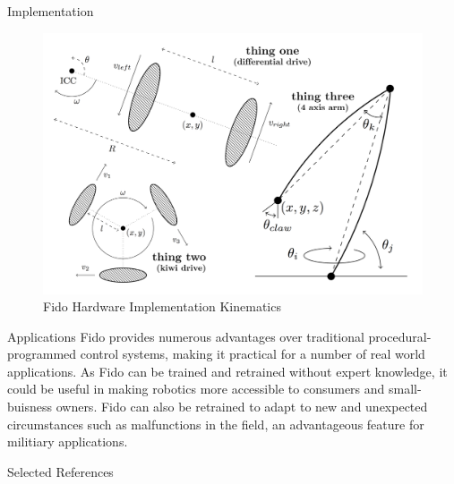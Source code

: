 \documentclass[final]{beamer}
\newlength{\onecolwid}
\begin{document}
\begin{frame}[t]
\begin{columns}[t]
\begin{column}{\onecolwid}
\begin{block}{Implementation}
		\vspace{-0.5in}

		\begin{figure}[ht]
			\centering
			\includegraphics[width=.8\linewidth]{Figures/combinedKinematics.png}
			\caption{Fido Hardware Implementation Kinematics}
		\end{figure}

		\vspace{-0.5in}

	\end{block}

	\begin{block}{Applications}
		Fido provides numerous advantages over traditional procedural-programmed control systems, making it practical for a number of real world applications.  As Fido can be trained and retrained without expert knowledge, it could be useful in making robotics more accessible to consumers and small-buisness owners.  Fido can also be retrained to adapt to new and unexpected circumstances such as malfunctions in the field, an advantageous feature for militiary applications.
	\end{block}

	\begin{block}{Selected References}
		\nocite{*}
		{\fontsize{25}{30}\vspace{0.75in}}
	\end{block}

\end{column}

\end{columns}
\end{frame}
\end{document}
